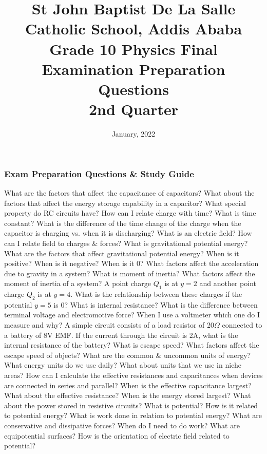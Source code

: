 \documentclass[13pt,addpoints]{exam}
\date{January, 2022}\usepackage{geometry}
\begin{document}
	\title{St John Baptist De La Salle Catholic School, Addis Ababa\\
		\large Grade 10 Physics Final Examination Preparation Questions\\
		2nd Quarter}
	\maketitle
	\subsubsection*{Exam Preparation Questions \& Study Guide}
				\begin{questions}
					\question What are the factors that affect the capacitance of capacitors? What about the factors that affect the energy storage capability in a capacitor? 
					\question What special property do RC circuits have? How can I relate charge with time? What is time constant? What is the difference of the time change of the charge when the capacitor is charging vs. when it is discharging?
					\question What is an electric field? How can I relate field to charges \& forces?
					\question What is gravitational potential energy? What are the factors that affect gravitational potential energy? When is it positive? When is it negative? When is it 0? What factors affect the acceleration due to gravity in a system?
					\question What is moment of inertia? What factors affect the moment of inertia of a system?
					\question A point charge $Q_1$ is at $y=2$ and another point charge $Q_2$ is at $y=4$. What is the relationship between these charges if the potential $y=5$ is 0?
					\question What is internal resistance? What is the difference between terminal voltage and electromotive force? When I use a voltmeter which one do I measure and why?
					\question A simple circuit consists of a load resistor of 20$\Omega$ connected to a battery of 8V EMF. If the current through the circuit is 2A, what is the internal resistance of the battery?
					\question What is escape speed? What factors affect the escape speed of objects?
					\question What are the common \& uncommon units of energy? What energy units do we use daily? What about units that we use in niche areas?
					\question How can I calculate the effective resistances and capacitances when devices are connected in series and parallel? When is the effective capacitance largest? What about the effective resistance? When is the energy stored largest? What about the power stored in resistive circuits?
					\question What is potential? How is it related to potential energy? What is work done in relation to potential energy? What are conservative and dissipative forces? When do I need to do work? What are equipotential surfaces? How is the orientation of electric field related to potential?

\end{questions}
\end{document}
